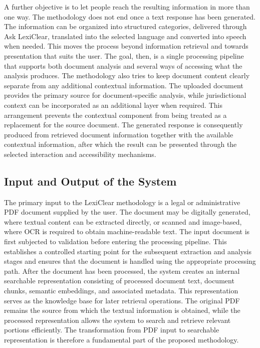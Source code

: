 \documentclass[12pt,a4paper,oneside]{report}
\begin{document}
A further objective is to let people reach the resulting information in more than one way. The methodology does not end once a text response has been generated. The information can be organized into structured categories, delivered through Ask LexiClear, translated into the selected language and converted into speech when needed. This moves the process beyond information retrieval and towards presentation that suits the user. The goal, then, is a single processing pipeline that supports both document analysis and several ways of accessing what the analysis produces. The methodology also tries to keep document content clearly separate from any additional contextual information. The uploaded document
provides the primary source for document-specific analysis, while
jurisdictional context can be incorporated as an additional layer when
required. This arrangement prevents the contextual component from being
treated as a replacement for the source document. The generated response
is consequently produced from retrieved document information together with
the available contextual information, after which the result can be
presented through the selected interaction and accessibility mechanisms.

\subsection{Input and Output of the System}

The primary input to the LexiClear methodology is a legal or administrative
PDF document supplied by the user. The document may be digitally generated,
where textual content can be extracted directly, or scanned and
image-based, where OCR is required to obtain machine-readable text. The
input document is first subjected to validation before entering the
processing pipeline. This establishes a controlled starting point for the
subsequent extraction and analysis stages and ensures that the document is
handled using the appropriate processing path. After the document has been processed, the system creates an internal
searchable representation consisting of processed document text, document
chunks, semantic embeddings, and associated metadata. This representation
serves as the knowledge base for later retrieval operations. The original
PDF remains the source from which the textual information is obtained,
while the processed representation allows the system to search and retrieve
relevant portions efficiently. The transformation from PDF input to
searchable representation is therefore a fundamental part of the proposed
methodology.
\end{document}
